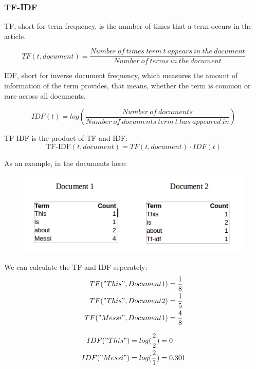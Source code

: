 \documentclass[12pt]{article}
\numberwithin{equation}{section}
\begin{document}
\subsubsection{TF-IDF}
	TF, short for term frequency, is the number of times that a term occurs in the article. \par
	\begin{equation}
		TF(t, document)=\frac{Number\ of\ times\ term\ t\ appears\ in\ the\ document}{Number\ of\ terms\ in\ the\ document}
	\end{equation} \par
	IDF, short for inverse document frequency, which measures the amount of information of the term provides, that means, whether the term is common or rare across all documents. \par
	\begin{equation}
		IDF(t)=log(\frac{Number\ of\ documents}{Number\ of\ documents\ term\ t\ has\ appeared\ in})
	\end{equation} \par
	TF-IDF is the product of TF and IDF:
	\begin{equation}
		\text{TF-IDF}(t, document) = TF(t, document) \cdot IDF(t)
	\end{equation} \par
	As an example, in the documents here:
	\begin{figure}[H]
		\includegraphics[width=\linewidth]{fig_QA/tfidf.png}
		\label{fig:tfidf}
	\end{figure} \par
	We can calculate the TF and IDF seperately:
	\begin{align*}
		TF("This",Document1) &= \frac{1}{8} \\
		TF("This",Document2) &= \frac{1}{5} \\
		TF("Messi",Document1) &= \frac{4}{8} 
	\end{align*} \par
	\begin{align*}
		IDF("This") &= log(\frac{2}{2}) = 0 \\
		IDF("Messi") &= log(\frac{2}{1}) = 0.301
	\end{align*} \par
\end{document}
